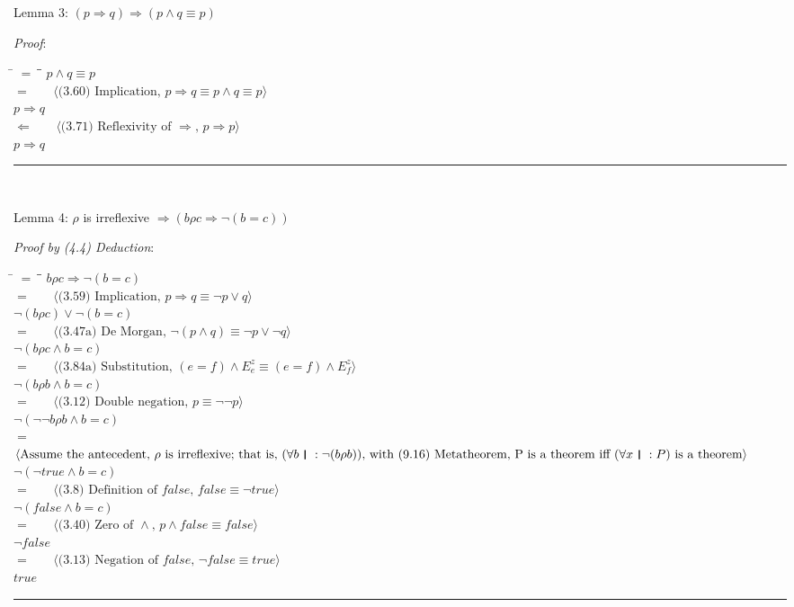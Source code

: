 \documentclass[12pt, fleqn, leqno]{article}
\newcommand{\lgap}{2pt}                             %
\newcommand{\mymathindent}{24pt}                    %
\newcommand{\impl}{\ensuremath{\Rightarrow}}        %
\newcommand{\foll}{\ensuremath{\Leftarrow}}         %
\newcommand{\myqed}{\rule[-.23ex]{1.2ex}{2.0ex}}
\newcommand{\myqedtab}{\hspace{384pt}}              %
\newcommand{\thedr}{\rule[-.25ex]{.32mm}{1.75ex}}   %
\newcommand{\dr}{\;\,\thedr\,\;}                    %
\newcommand{\rb}{:}                                 %
\newcommand{\all}{\forall}                          %
\newcommand{\Gll} {\langle}                         %
\newcommand{\Ggg} {\rangle}                         %
\newcommand{\Hint}[1]     {\ \ \ $\Gll              \mbox{#1} \Ggg$ }   %
\begin{document}
Lemma 3: $(p \impl q) \impl (p \land q \equiv p)$

\textit{Proof}:
\begin{tabbing}
\hspace{\mymathindent} \= $= \;$ \= \myqedtab \= \kill
	\> \>  $p \land q \equiv p$\\
	\> $=$  \>  \Hint{(3.60) Implication, $p \impl q \equiv p \land q \equiv p$}\\[\lgap]
	\> \>   $p \impl q$\\
	\> $\foll$  \>  \Hint{(3.71) Reflexivity of $\impl$, $p \impl p$}\\[\lgap]
	\> \>   $p \impl q$ \quad \myqed\\
\end{tabbing}

Lemma 4: $\rho$ is irreflexive $\impl (b \rho c \impl \lnot (b = c))$

\textit{Proof by (4.4) Deduction}:
\begin{tabbing}
\hspace{\mymathindent} \= $= \;$ \= \myqedtab \= \kill
	\> \>  $b \rho c \impl \lnot (b = c)$\\
	\> $=$  \>  \Hint{(3.59) Implication, $p \impl q \equiv \lnot p \lor q$}\\[\lgap]
	\> \>   $\lnot (b \rho c) \lor \lnot (b = c)$\\
	\> $=$  \>  \Hint{(3.47a) De Morgan, $\lnot (p \land q) \equiv \lnot p \lor \lnot q$}\\[\lgap]
	\> \>   $\lnot (b \rho c \land b = c)$\\
	\> $=$  \>  \Hint{(3.84a) Substitution, $(e = f) \land E^z_e \equiv (e = f) \land E^z_f$}\\[\lgap]
	\> \>   $\lnot (b \rho b \land b = c)$\\
	\> $=$  \>  \Hint{(3.12) Double negation, $p \equiv \lnot \lnot p$}\\[\lgap]
	\> \>   $\lnot (\lnot \lnot b \rho b \land b = c)$\\
	\> $=$  \>  \Hint{Assume the antecedent, $\rho$ is irreflexive; that is, $(\all b \dr \rb \lnot (b \rho b))$, with (9.16) Metatheorem, P is a theorem iff $(\all x \dr \rb P)$ is a theorem}\\[\lgap]
	\> \>   $\lnot (\lnot true \land b = c)$\\
	\> $=$  \>  \Hint{(3.8) Definition of $false$, $false \equiv \lnot true$}\\[\lgap]
	\> \>   $\lnot (false \land b = c)$\\
	\> $=$  \>  \Hint{(3.40) Zero of $\land$, $p \land false \equiv false$}\\[\lgap]
	\> \>  $\lnot false$\\
	\> $=$  \>  \Hint{(3.13) Negation of $false$, $\lnot false \equiv true$}\\[\lgap]
	\> \>   $true$ \quad \myqed\\
\end{tabbing}
\end{document}
